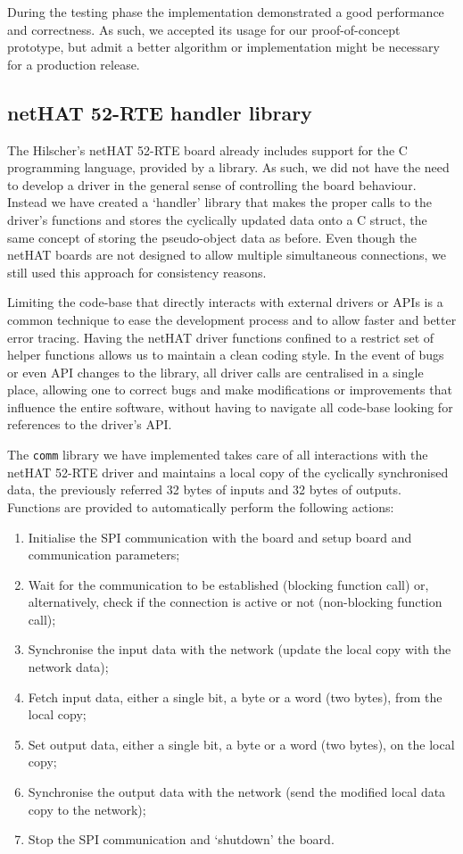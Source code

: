 During the testing phase the implementation demonstrated a good performance and correctness.
As such, we accepted its usage for our proof-of-concept prototype, but admit a better algorithm or implementation might be necessary for a production release.

\subsection{netHAT 52-RTE handler library}
The Hilscher's netHAT 52-RTE board already includes support for the C programming language, provided by a library.
As such, we did not have the need to develop a driver in the general sense of controlling the board behaviour.
Instead we have created a `handler' library that makes the proper calls to the driver's functions and stores the cyclically updated data onto a C struct, the same concept of storing the pseudo-object data as before.
Even though the netHAT boards are not designed to allow multiple simultaneous connections, we still used this approach for consistency reasons.

Limiting the code-base that directly interacts with external drivers or APIs is a common technique to ease the development process and to allow faster and better error tracing.
Having the netHAT driver functions confined to a restrict set of helper functions allows us to maintain a clean coding style.
In the event of bugs or even API changes to the library, all driver calls are centralised in a single place, allowing one to correct bugs and make modifications or improvements that influence the entire software, without having to navigate all code-base looking for references to the driver's API.

The \verb|comm| library we have implemented takes care of all interactions with the netHAT 52-RTE driver and maintains a local copy of the cyclically synchronised data, the previously referred 32 bytes of inputs and 32 bytes of outputs.
Functions are provided to automatically perform the following actions:

\begin{enumerate}
	\item Initialise the SPI communication with the board and setup board and communication parameters; \label{misc:comm_step_1}
	\item Wait for the communication to be established (blocking function call) or, alternatively, check if the connection is active or not (non-blocking function call); \label{misc:comm_step_2}
	\item Synchronise the input data with the network (update the local copy with the network data);
	\item Fetch input data, either a single bit, a byte or a word (two bytes), from the local copy;
	\item Set output data, either a single bit, a byte or a word (two bytes), on the local copy;
	\item Synchronise the output data with the network (send the modified local data copy to the network); \label{misc:comm_step_6}
	\item Stop the SPI communication and `shutdown' the board. \label{misc:comm_step_7}
\end{enumerate}

